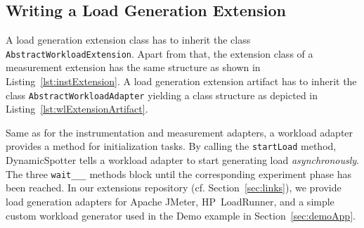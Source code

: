 \documentclass{report}
\newcommand{\DS}{DynamicSpotter }
\begin{document}
\subsection{Writing a Load Generation Extension}
A load generation extension class has to inherit the class \texttt{AbstractWorkloadExtension}. Apart from that, the
extension class of a measurement extension has the same structure as shown in Listing~\ref{lst:instExtension}.
A load generation extension artifact has to inherit the class \texttt{AbstractWorkloadAdapter} yielding a class
structure as depicted in Listing~\ref{lst:wlExtensionArtifact}.

Same as for the instrumentation and measurement adapters, a workload adapter provides a method for initialization tasks.
By calling the \texttt{startLoad} method, \DS tells a workload adapter to start generating load \emph{asynchronously}. 
The three \texttt{wait\_\_\_} methods block until the corresponding experiment phase has been reached.
In our extensions repository (cf. Section~\ref{sec:links}), we provide load generation adapters for Apache JMeter,
HP~LoadRunner, and a simple custom workload generator used in the Demo example in Section~\ref{sec:demoApp}.
\end{document}
